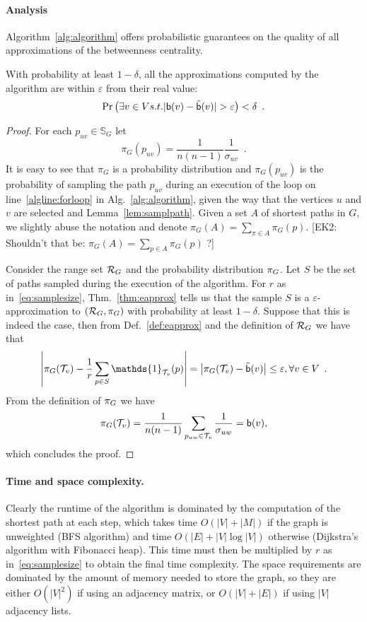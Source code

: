 \paragraph{Analysis}\label{sec:analysis}
Algorithm~\ref{alg:algorithm} offers
probabilistic guarantees on the quality of all approximations of the betweenness
centrality.
\begin{lemma}\label{lem:correctness}
  With probability at least $1-\delta$, all the approximations computed by the
  algorithm are within $\varepsilon$ from their real value:
  \[
  \Pr\left(\exists v\in V \mbox{ s.t. }
  |\betw(v)-\tilde\betw(v)|>\varepsilon\right)<\delta\enspace .
  \]
\end{lemma}

\begin{proof}
  For each $p_{uv}\in\mathbb{S}_G$ let
  \[
  \pi_G(p_{uv})=\frac{1}{n(n-1)}\frac{1}{\sigma_{uv}}\enspace.
  \]
  It is easy to see that $\pi_G$ is a probability distribution and
  $\pi_G(p_{uv})$ is the probability of sampling the path $p_{uv}$ during an
  execution of the loop on line~\ref{algline:forloop} in
  Alg.~\ref{alg:algorithm}, given the way that the vertices $u$ and $v$ are
  selected and Lemma~\ref{lem:samplpath}. Given a set $A$ of shortest paths in
  $G$, we slightly abuse the notation and denote $\pi_G(A)=\sum_{\pi\in A}
  \pi_G(p)$.
  [EK2: Shouldn't that be: $\pi_G(A)=\sum_{p\in A}\pi_G(p)$ ?]
  
  Consider the range set $\mathcal{R}_G$ and the probability distribution $\pi_G$.
  Let $S$ be the set of paths sampled during the execution of the algorithm.
  For $r$ as in~\eqref{eq:samplesize}, Thm.~\ref{thm:eapprox} tells us that the sample $S$ is a
  $\varepsilon$-approximation to $(\mathcal{R}_G,\pi_G)$ with probability at least
  $1-\delta$. Suppose that this is indeed the case, then from
  Def.~\ref{def:eapprox} and the definition of $\mathcal{R}_G$ we have that
  \[
  \left|\prob_G(\mathcal{T}_v) - \frac{1}{r}\sum_{p\in
  S}\mathds{1}_{\mathcal{T}_v}(p)\right|=\left|\prob_G(\mathcal{T}_v) -
  \tilde\betw(v)\right|\le\varepsilon, \forall v\in
  V\enspace.
  \]
  From the definition of $\pi_G$ we have
  \[
  \pi_G(\mathcal{T}_v)=\frac{1}{n(n-1)}\sum_{p_{uw}\in\mathcal{T}_v}\frac{1}{\sigma_{uw}}=\mathsf{b}(v),
  \]
  which concludes the proof.
\end{proof}

\ifproof
\paragraph{Time and space complexity.} Clearly the runtime of the algorithm is
dominated by the computation of the shortest path at each step, which takes time
$O(|V|+|M|)$ if the graph is unweighted (BFS algorithm) and time
$O(|E|+|V|\log|V|)$ otherwise (Dijkstra's algorithm with Fibonacci heap).
This time must then be multiplied by $r$ as in~\eqref{eq:samplesize} to obtain
the final time complexity. The space requirements are dominated by the amount of
memory needed to store the graph, so they are either $O(|V|^2)$ if using an
adjacency matrix, or $O(|V|+|E|)$ if using $|V|$ adjacency lists.
\fi

